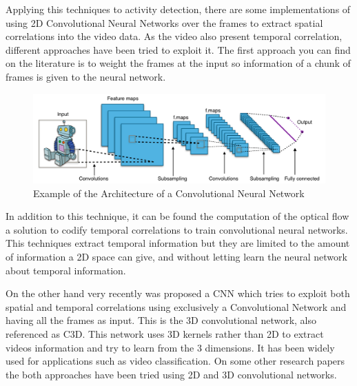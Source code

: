 Applying this techniques to activity detection, there are some implementations of using 2D Convolutional Neural Networks over the frames\cite{gkioxari2015contextual}\cite{yeung2015end}\cite{ballas2015delving} to extract spatial correlations into the video data. As the video also present temporal correlation, different approaches have been tried to exploit it. The first approach you can find on the literature is to weight the frames at the input\cite{yeung2015every} so information of a chunk of frames is given to the neural network. 

\begin{figure}[ht]
\begin{center}
\includegraphics[width=1\linewidth]{img/stateofart/cnn_architecture}
\end{center}
\caption{Example of the Architecture of a Convolutional Neural Network}
\label{fig:cnn_architecture}
\end{figure}

In addition to this technique, it can be found the computation of the optical flow a solution to codify temporal correlations to train convolutional neural networks\cite{simonyan2014two}\cite{Ng_2015_CVPR}. This techniques extract temporal information but they are limited to the amount of information a 2D space can give, and without letting learn the neural network about temporal information. 



On the other hand very recently was proposed a CNN which tries to exploit both spatial and temporal correlations using exclusively a Convolutional Network and having all the frames as input. This is the 3D convolutional network, also referenced as C3D\cite{tran2014learning}. This network uses 3D kernels rather than 2D to extract videos information and try to learn from the 3 dimensions. It has been widely used\cite{baccouche2011sequential}\cite{tran2015deep}\cite{tran2014learning}\cite{shoutemporal} for applications such as video classification. On some other research papers\cite{yao2015describing}\cite{zhang2016modelling} the both approaches have been tried using 2D and 3D convolutional networks.

